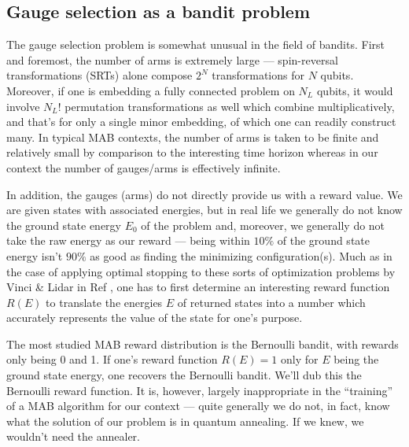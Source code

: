 \subsection{Gauge selection as a bandit problem}
The gauge selection problem is somewhat unusual in the field of bandits. First and foremost, the number of arms is extremely large --- spin-reversal transformations (SRTs) alone compose $2^N$ transformations for $N$ qubits. Moreover, if one is embedding a fully connected problem on $N_L$ qubits, it would involve $N_L!$ permutation transformations as well which combine multiplicatively, and that's for only a single minor embedding, of which one can readily construct many. In typical MAB contexts, the number of arms is taken to be finite and relatively small by comparison to the interesting time horizon whereas in our context the number of gauges/arms is effectively infinite.

In addition, the gauges (arms) do not directly provide us with a reward value. We are given states with associated energies, but in real life we generally do not know the ground state energy $E_0$ of the problem and, moreover, we generally do not take the raw energy as our reward --- being within $10\%$ of the ground state energy isn't $90\%$ as good as finding the minimizing configuration(s). Much as in the case of applying optimal stopping to these sorts of optimization problems by Vinci \& Lidar in Ref \cite{vinci2016optimally}, one has to first determine an interesting reward function $R(E)$ to translate the energies $E$ of returned states into a number which accurately represents the value of the state for one's purpose.

The most studied MAB reward distribution is the Bernoulli bandit, with rewards only being 0 and 1. If one's reward function $R(E)=1$ only for $E$ being the ground state energy, one recovers the Bernoulli bandit. We'll dub this the Bernoulli reward function. It is, however, largely inappropriate in the ``training'' of a MAB algorithm for our context --- quite generally we do not, in fact, know what the solution of our problem is in quantum annealing. If we knew, we wouldn't need the annealer. 

